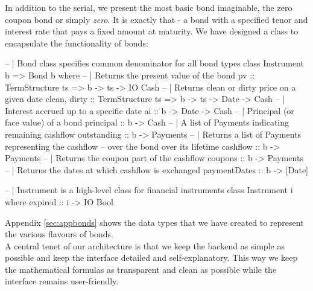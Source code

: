 In addition to the serial, we present the most basic bond imaginable, the zero 
coupon bond or simply \emph{zero}. It is exactly that - a bond with a specified 
tenor and interest rate that pays a fixed amount at maturity. We have designed 
a class to encapsulate the functionality of bonds:

\begin{hscode}
-- | Bond class specifies common denominator for all bond types 
class Instrument b => Bond b where
  -- | Returns the present value of the bond
  pv           :: TermStructure ts => b -> ts -> IO Cash
  -- | Returns clean or dirty price on a given date
  clean, dirty :: TermStructure ts => b -> ts -> Date -> Cash
  -- | Interest accrued up to a specific date
  ai           :: b -> Date -> Cash
  -- | Principal (or face value) of a bond
  principal    :: b -> Cash
  -- | A list of Payments indicating remaining cashflow
  outstanding  :: b -> Payments
  -- | Returns a list of Payments representing the cashflow
  -- over the bond over its lifetime
  cashflow     :: b -> Payments
  -- | Returns the coupon part of the cashflow
  coupons      :: b -> Payments
  -- | Returns the dates at which cashflow is exchanged
  paymentDates :: b -> [Date]
\end{hscode}


\begin{hscode}
-- | Instrument is a high-level class for financial instruments
class Instrument i where
  expired :: i -> IO Bool
\end{hscode}



Appendix \ref{sec:appbonds} shows the data types that we have created
to represent the various flavours of bonds.\\ 

A central tenet of our architecture is that we keep the backend
as simple as possible and keep the interface detailed and 
self-explanatory. This way we keep the mathematical formulas as transparent
and clean as possible while the interface remains user-friendly.\\




